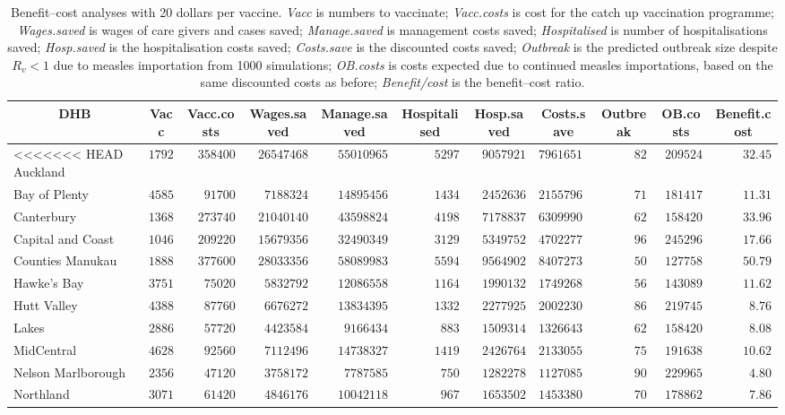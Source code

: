 \documentclass{article}
\begin{document}
\begin{itemize}
\begin{table}\small
\caption{Benefit--cost analyses with 20 dollars per vaccine. \textit{Vacc} is numbers to vaccinate; \textit{Vacc.costs} is cost for the catch up vaccination programme; \textit{Wages.saved} is wages of care givers and cases saved; \textit{Manage.saved} is management costs saved; \textit{Hospitalised} is number of hospitalisations saved; \textit{Hosp.saved} is the hospitalisation costs saved; \textit{Costs.save}	is the discounted costs saved; \textit{Outbreak}	is the predicted outbreak size despite $R_v < 1$ due to measles importation from 1000 simulations; \textit{OB.costs}	is costs expected due to continued measles importations, based on the same discounted costs as before; \textit{Benefit/cost} is the benefit--cost ratio.}
\begin{center}
\begin{tabular}{lrrrrrrrrrr}
\hline\hline
\multicolumn{1}{c}{DHB}&\multicolumn{1}{c}{Vacc}&\multicolumn{1}{c}{Vacc.costs}&\multicolumn{1}{c}{Wages.saved}&\multicolumn{1}{c}{Manage.saved}&\multicolumn{1}{c}{Hospitalised}&\multicolumn{1}{c}{Hosp.saved}&\multicolumn{1}{c}{Costs.save}&\multicolumn{1}{c}{Outbreak}&\multicolumn{1}{c}{OB.costs}&\multicolumn{1}{c}{Benefit.cost}\tabularnewline
\hline
<<<<<<< HEAD
Auckland&$17920$&$358400$&$26547468$&$55010965$&$5297$&$9057921$&$79616516$&$ 82$&$209524$&$32.45$\tabularnewline
Bay of Plenty&$ 4585$&$ 91700$&$ 7188324$&$14895456$&$1434$&$2452636$&$21557962$&$ 71$&$181417$&$11.31$\tabularnewline
Canterbury&$13687$&$273740$&$21040140$&$43598824$&$4198$&$7178837$&$63099902$&$ 62$&$158420$&$33.96$\tabularnewline
Capital and Coast&$10461$&$209220$&$15679356$&$32490349$&$3129$&$5349752$&$47022778$&$ 96$&$245296$&$17.66$\tabularnewline
Counties Manukau&$18880$&$377600$&$28033356$&$58089983$&$5594$&$9564902$&$84072731$&$ 50$&$127758$&$50.79$\tabularnewline
Hawke's Bay&$ 3751$&$ 75020$&$ 5832792$&$12086558$&$1164$&$1990132$&$17492688$&$ 56$&$143089$&$11.62$\tabularnewline
Hutt Valley&$ 4388$&$ 87760$&$ 6676272$&$13834395$&$1332$&$2277925$&$20022305$&$ 86$&$219745$&$ 8.76$\tabularnewline
Lakes&$ 2886$&$ 57720$&$ 4423584$&$ 9166434$&$ 883$&$1509314$&$13266438$&$ 62$&$158420$&$ 8.08$\tabularnewline
MidCentral&$ 4628$&$ 92560$&$ 7112496$&$14738327$&$1419$&$2426764$&$21330552$&$ 75$&$191638$&$10.62$\tabularnewline
Nelson Marlborough&$ 2356$&$ 47120$&$ 3758172$&$ 7787585$&$ 750$&$1282278$&$11270851$&$ 90$&$229965$&$ 4.80$\tabularnewline
Northland&$ 3071$&$ 61420$&$ 4846176$&$10042118$&$ 967$&$1653502$&$14533802$&$ 70$&$178862$&$ 7.86$\tabularnewline

\end{tabular}
\end{center}
\end{table}
\end{itemize}
\end{document}
